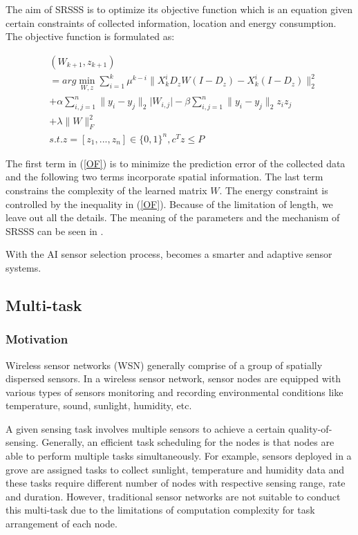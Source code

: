 The aim of SRSSS is to optimize its objective function which is an equation given
certain constraints of collected information, location and energy consumption.
The objective function is formulated as:

\begin{equation}
\label{OF}
\begin{aligned}
& (W_{k+1},z_{k+1})  \\
& = arg \min_{W,z} \sum_{i=1}^k \mu^{k-i}\lVert X_k^iD_zW(I-D_z)-X_k^i(I-D_z)\rVert^2_2 \\
& + \alpha\sum_{i,j=1}^n\lVert y_i-y_j\rVert_2\lvert W_{i,j} \rvert - \beta\sum_{i,j=1}^n\lVert y_i-y_j\rVert_2 z_iz_j \\
& + \lambda\lVert W \rVert^2_F \\
&s.t. z = [z_1,...,z_n] \in {\{0,1\}}^n, c^Tz \leq P
\end{aligned}
\end{equation}

The first term in (\ref{OF}) is to minimize the prediction error of the collected data
and the following two terms incorporate spatial information. The last term constrains
the complexity of the learned matrix $W$. The energy constraint is controlled by 
the inequality in (\ref{OF}). Because of the limitation of length,  we leave out all the details. 
The meaning of the parameters and the mechanism of 
SRSSS can be seen in \cite{li2016spatially}. 

With the AI sensor selection process, {\sdn} becomes a smarter and adaptive sensor systems. 






\subsection{Multi-task}

\subsubsection{Motivation}

Wireless sensor networks (WSN)  generally comprise of a group of 
spatially dispersed sensors. In a wireless sensor network, 
sensor nodes are equipped with various 
types of sensors monitoring and recording 
environmental conditions like temperature, sound, sunlight,
humidity, etc.

A given sensing task involves multiple sensors to 
achieve a certain quality-of-sensing.
Generally, an efficient task scheduling for the nodes is that nodes 
are able to perform multiple tasks simultaneously. 
For example, sensors deployed in a grove are assigned tasks to collect
sunlight, temperature and humidity data and these tasks require different 
number of  nodes with respective sensing range, rate and duration.
However, traditional sensor networks are not suitable to conduct this 
multi-task due to the limitations of computation complexity for task 
arrangement of each node.

